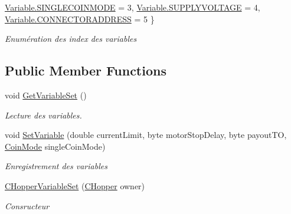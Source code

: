 \begin{DoxyCompactItemize}
\mbox{\hyperlink{class_device_library_1_1_c_hopper_variable_set_a3b79d051f89692abb5d34ae3f4e946bead989518c433e0f8cd3d13553971ae26d}{Variable.\+S\+I\+N\+G\+L\+E\+C\+O\+I\+N\+M\+O\+DE}} = 3, 
\mbox{\hyperlink{class_device_library_1_1_c_hopper_variable_set_a3b79d051f89692abb5d34ae3f4e946bea7040277bb149f1bd783b3f78ad856099}{Variable.\+S\+U\+P\+P\+L\+Y\+V\+O\+L\+T\+A\+GE}} = 4, 
\mbox{\hyperlink{class_device_library_1_1_c_hopper_variable_set_a3b79d051f89692abb5d34ae3f4e946beaf12ce2bca6832b6bcb08478fb3d50026}{Variable.\+C\+O\+N\+N\+E\+C\+T\+O\+R\+A\+D\+D\+R\+E\+SS}} = 5
 \}
\begin{DoxyCompactList}\small\item\em Enumération des index des variables \end{DoxyCompactList}\end{DoxyCompactItemize}
\subsection*{Public Member Functions}
\begin{DoxyCompactItemize}
\item 
void \mbox{\hyperlink{class_device_library_1_1_c_hopper_variable_set_a1567005412479877bf1b888e5dc2290b}{Get\+Variable\+Set}} ()
\begin{DoxyCompactList}\small\item\em Lecture des variables. \end{DoxyCompactList}\item 
void \mbox{\hyperlink{class_device_library_1_1_c_hopper_variable_set_a1286acc7b9df9309ed0577bfb80366f7}{Set\+Variable}} (double current\+Limit, byte motor\+Stop\+Delay, byte payout\+TO, \mbox{\hyperlink{class_device_library_1_1_c_hopper_variable_set_a6d46e753370657ed1e4f4ab7bea0dacf}{Coin\+Mode}} single\+Coin\+Mode)
\begin{DoxyCompactList}\small\item\em Enregistrement des variables \end{DoxyCompactList}\item 
\mbox{\hyperlink{class_device_library_1_1_c_hopper_variable_set_ac41108d80eb84d8f3c4a17b7823eb267}{C\+Hopper\+Variable\+Set}} (\mbox{\hyperlink{class_device_library_1_1_c_hopper}{C\+Hopper}} owner)
\begin{DoxyCompactList}\small\item\em Consructeur \end{DoxyCompactList}\end{DoxyCompactItemize}
